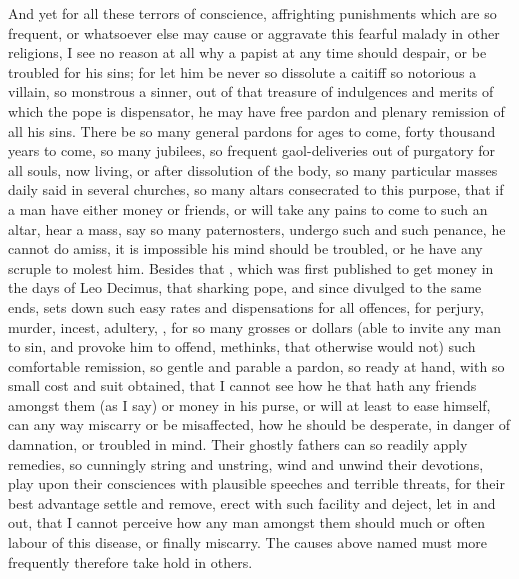 {And yet for all these terrors of conscience, affrighting punishments
which are so frequent, or whatsoever else may cause or aggravate this
fearful malady in other religions, I see no reason at all why a papist
at any time should despair, or be troubled for his sins; for let him be
never so dissolute a caitiff so notorious a villain, so monstrous a
sinner, out of that treasure of indulgences and merits of which the
pope is dispensator, he may have free pardon and plenary remission of
all his sins. There be so many general pardons for ages to come, forty
thousand years to come, so many jubilees, so frequent gaol-deliveries
out of purgatory for all souls, now living, or after dissolution of the
body, so many particular masses daily said in several churches, so many
altars consecrated to this purpose, that if a man have either money or
friends, or will take any pains to come to such an altar, hear a mass,
say so many paternosters, undergo such and such penance, he cannot do
amiss, it is impossible his mind should be troubled, or he have any
scruple to molest him. Besides that , which was
first published to get money in the days of Leo Decimus, that sharking
pope, and since divulged to the same ends, sets down such easy rates
and dispensations for all offences, for perjury, murder, incest,
adultery, \etc{}, for so many grosses or dollars (able to invite any man
to sin, and provoke him to offend, methinks, that otherwise would not)
such comfortable remission, so gentle and parable a pardon, so ready at
hand, with so small cost and suit obtained, that I cannot see how he
that hath any friends amongst them (as I say) or money in his purse, or
will at least to ease himself, can any way miscarry or be misaffected,
how he should be desperate, in danger of damnation, or troubled in
mind. Their ghostly fathers can so readily apply remedies, so cunningly
string and unstring, wind and unwind their devotions, play upon their
consciences with plausible speeches and terrible threats, for their
best advantage settle and remove, erect with such facility and deject,
let in and out, that I cannot perceive how any man amongst them should
much or often labour of this disease, or finally miscarry. The causes
above named must more frequently therefore take hold in others.

}
